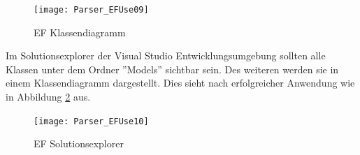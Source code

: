 \begin{figure}[H]
    \centering
    \texttt{[image: Parser\_EFUse09]}
    \caption{EF Klassendiagramm}
    \label{fig:parsef09}
\end{figure} 
Im Solutionsexplorer der Visual Studio Entwicklungsumgebung sollten alle Klassen unter dem Ordner ''Models'' sichtbar sein. Des weiteren werden sie in einem Klassendiagramm dargestellt. Dies sieht nach erfolgreicher Anwendung wie in Abbildung \ref{fig:parsef10} aus. 
\begin{figure}[H]
    \centering
    \texttt{[image: Parser\_EFUse10]}
    \caption{EF Solutionsexplorer}
    \label{fig:parsef10}
\end{figure} 


%
%
